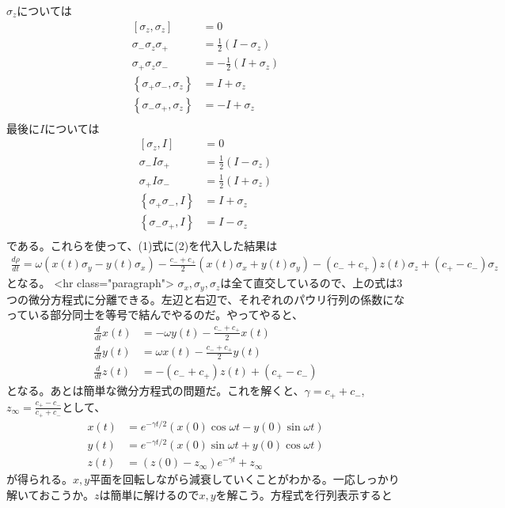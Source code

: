 \(\sigma_z\)については
\begin{align}
\left[\sigma_z,\sigma_z\right] &= 0 \\
\sigma_-\sigma_z\sigma_+ &= \frac{1}{2}(I-\sigma_z) \\
\sigma_+\sigma_z\sigma_- &= -\frac{1}{2}(I+\sigma_z) \\
\left\{\sigma_+ \sigma_- , \sigma_z\right\} &= I+\sigma_z \\
\left\{\sigma_- \sigma_+ , \sigma_z\right\} &= -I+\sigma_z \\
\end{align}
最後に\(I\)については
\begin{align}
\left[\sigma_z,I\right] &= 0 \\
\sigma_-I\sigma_+ &= \frac{1}{2}(I-\sigma_z) \\
\sigma_+I\sigma_- &= \frac{1}{2}(I+\sigma_z) \\
\left\{\sigma_+ \sigma_- , I\right\} &= I+\sigma_z \\
\left\{\sigma_- \sigma_+ , I\right\} &= I-\sigma_z \\
\end{align}
である。これらを使って、(1)式に(2)を代入した結果は
\begin{align}
\frac{d\rho}{dt} = \omega(x(t)\sigma_y - y(t)\sigma_x) - \frac{c_- + c_+}{2}(x(t)\sigma_x+y(t)\sigma_y) - (c_-+c_+)z(t)\sigma_z + (c_+ - c_-)\sigma_z
\end{align}
となる。
<hr class="paragraph">
\(\sigma_x,\sigma_y,\sigma_z\)は全て直交しているので、上の式は3つの微分方程式に分離できる。左辺と右辺で、それぞれのパウリ行列の係数になっている部分同士を等号で結んでやるのだ。やってやると、
\begin{align}
\frac{d}{dt}x(t) &= -\omega y(t) - \frac{c_- + c_+}{2}x(t)  \\
\frac{d}{dt}y(t) &= \omega x(t) - \frac{c_- + c_+}{2}y(t)  \\
\frac{d}{dt}z(t) &= -(c_-+c_+)z(t) + (c_+ - c_-)
\end{align}
となる。あとは簡単な微分方程式の問題だ。これを解くと、\(\gamma=c_++c_-\), \(z_\infty = \frac{c_+ - c_-}{c_+ +c_-}\)として、
\begin{align}
x(t) &= e^{-\gamma t/2}(x(0)\cos\omega t - y(0)\sin\omega t) \\
y(t) &= e^{-\gamma t/2}(x(0)\sin\omega t + y(0)\cos\omega t) \\
z(t) &= \left(z(0)-z_\infty \right)e^{-\gamma t} + z_\infty
\end{align}
が得られる。\(x,y\)平面を回転しながら減衰していくことがわかる。一応しっかり解いておこうか。\(z\)は簡単に解けるので\(x,y\)を解こう。方程式を行列表示すると
